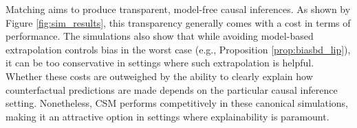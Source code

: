 \documentclass{article}
\begin{document}
Matching aims to produce transparent, model-free causal inferences.
As shown by Figure \ref{fig:sim_results}, this transparency generally comes with a cost in terms of performance.
The simulations also show that while avoiding model-based extrapolation controls bias in the worst case (e.g., Proposition \ref{prop:biasbd_lip}), it can be too conservative in settings where such extrapolation is helpful.
Whether these costs are outweighed by the ability to clearly explain how counterfactual predictions are made depends on the particular causal inference setting.
Nonetheless, CSM performs competitively in these canonical simulations, making it an attractive option in settings where explainability is paramount.



\end{document}
